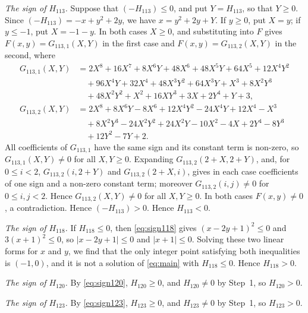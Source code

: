 \documentclass[11pt]{article}
\begin{document}
\emph{The sign of $H_{113}$.} Suppose that $(-H_{113})\leq0$, and put $Y=H_{113}$, so that $Y\geq0$. Since $(-H_{113})=-x+y^{2}+2y$, we have $x=y^{2}+2y+Y$. If $y\geq0$, put $X=y$; if $y\leq-1$, put $X=-1-y$. In both cases $X\geq0$, and substituting into $F$ gives $F(x,y)=G_{113,1}(X,Y)$ in the first case and $F(x,y)=G_{113,2}(X,Y)$ in the second, where
\begin{align*}
G_{113,1}(X,Y)&=2X^{8}+16X^{7}+8X^{6}Y+48X^{6}+48X^{5}Y+64X^{5}+12X^{4}Y^{2}\\
&\quad+96X^{4}Y+32X^{4}+48X^{3}Y^{2}+64X^{3}Y+X^{3}+8X^{2}Y^{3}\\
&\quad+48X^{2}Y^{2}+X^{2}+16XY^{3}+3X+2Y^{4}+Y+3,\\
G_{113,2}(X,Y)&=2X^{8}+8X^{6}Y-8X^{6}+12X^{4}Y^{2}-24X^{4}Y+12X^{4}-X^{3}\\
&\quad+8X^{2}Y^{3}-24X^{2}Y^{2}+24X^{2}Y-10X^{2}-4X+2Y^{4}-8Y^{3}\\
&\quad+12Y^{2}-7Y+2.
\end{align*}
All coefficients of $G_{113,1}$ have the same sign and its constant term is non-zero, so $G_{113,1}(X,Y)\neq0$ for all $X,Y\geq0$. Expanding $G_{113,2}(2+X,2+Y)$, and, for $0\leq i<2$, $G_{113,2}(i,2+Y)$ and $G_{113,2}(2+X,i)$, gives in each case coefficients of one sign and a non-zero constant term; moreover $G_{113,2}(i,j)\neq0$ for $0\leq i,j<2$. Hence $G_{113,2}(X,Y)\neq0$ for all $X,Y\geq0$. In both cases $F(x,y)\neq0$, a contradiction. Hence $(-H_{113})>0$. Hence $H_{113}<0$.

\emph{The sign of $H_{118}$.} If $H_{118}\leq0$, then \eqref{eq:sign118} gives $(x-2y+1)^2\leq 0$ and $3(x+1)^2\leq 0$, so $|x-2y+1|\leq0$ and $|x+1|\leq0$. Solving these two linear forms for $x$ and $y$, we find that the only integer point satisfying both inequalities is $(-1,0)$, and it is not a solution of \eqref{eq:main} with $H_{118}\leq0$. Hence $H_{118}>0$.

\emph{The sign of $H_{120}$.} By \eqref{eq:sign120}, $H_{120}\geq0$, and $H_{120}\neq0$ by Step~1, so $H_{120}>0$.

\emph{The sign of $H_{123}$.} By \eqref{eq:sign123}, $H_{123}\geq0$, and $H_{123}\neq0$ by Step~1, so $H_{123}>0$.
\end{document}

